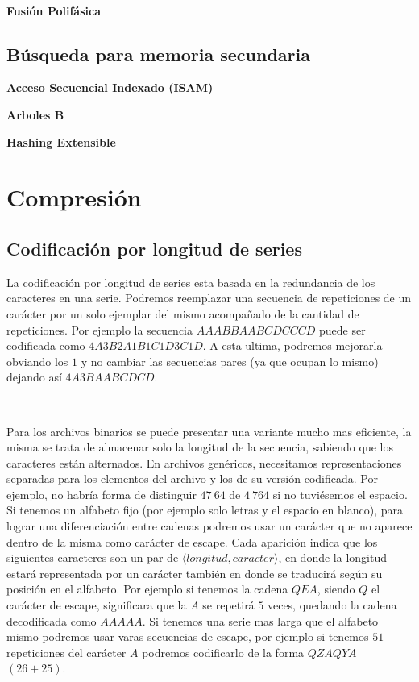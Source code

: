 ~

\textbf{Fusi\'on Polif\'asica}

\subsection{B\'usqueda para memoria secundaria}

\textbf{Acceso Secuencial Indexado (ISAM)}

\textbf{Arboles B}

\textbf{Hashing Extensible}

\newpage
\section{Compresi\'on}
\subsection{Codificaci\'on por longitud de series}

La codificaci\'on por longitud de series esta basada en la redundancia de los caracteres en una serie. Podremos reemplazar una secuencia de repeticiones de un car\'acter por un solo ejemplar del mismo acompa\~nado de la cantidad de repeticiones. Por ejemplo la secuencia $AAABBAABCDCCCD$ puede ser codificada como $4A3B2A1B1C1D3C1D$. A esta ultima, podremos mejorarla obviando los $1$ y no cambiar las secuencias pares (ya que ocupan lo mismo) dejando as\'i $4A3BAABCDCD$.

~

Para los archivos binarios se puede presentar una variante mucho mas eficiente, la misma se trata de almacenar solo la longitud de la secuencia, sabiendo que los caracteres est\'an alternados. En archivos gen\'ericos, necesitamos representaciones separadas para los elementos del archivo y los de su versi\'on codificada. Por ejemplo, no habr\'ia forma de distinguir $47\ 64$ de $4\ 764$ si no tuvi\'esemos el espacio. Si tenemos un alfabeto fijo (por ejemplo solo letras y el espacio en blanco), para lograr una diferenciaci\'on entre cadenas podremos usar un car\'acter que no aparece dentro de la misma como car\'acter de escape. Cada aparici\'on indica que los siguientes caracteres son un par de $\langle longitud, caracter \rangle$, en donde la longitud estar\'a representada por un car\'acter tambi\'en en donde se traducir\'a seg\'un su posici\'on en el alfabeto. Por ejemplo si tenemos la cadena $QEA$, siendo $Q$ el car\'acter de escape, significara que la $A$ se repetir\'a $5$ veces, quedando la cadena
decodificada como $AAAAA$. Si tenemos una serie mas larga que el alfabeto mismo podremos usar varas secuencias de escape, por ejemplo si tenemos $51$ repeticiones del car\'acter $A$ podremos codificarlo de la forma $QZAQYA$ $(26+25)$.

